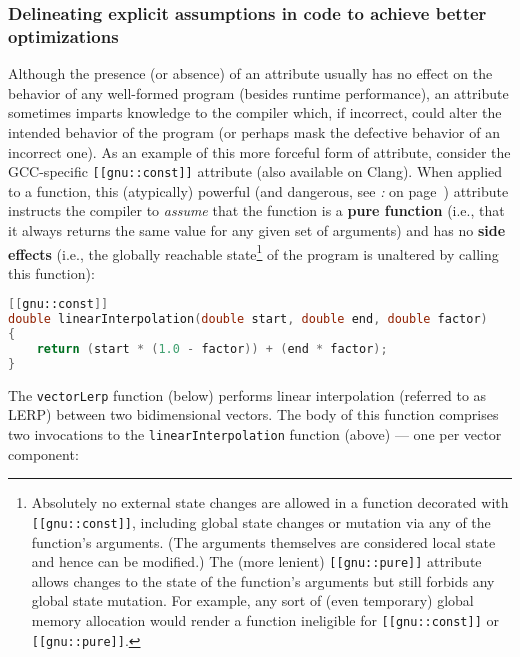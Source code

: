 \subsubsection[Delineating explicit assumptions in code to achieve better optimizations]{Delineating explicit assumptions in code to achieve better optimizations}\label{delineating-explicit-assumptions-in-code-to-achieve-better-optimizations}

Although the presence (or absence) of an attribute usually has no effect
on the behavior of any well-formed program (besides runtime performance),
an attribute sometimes imparts knowledge to the compiler
which, if incorrect, could alter the intended behavior of the program
(or perhaps mask the defective behavior of an incorrect one). As an
example of this more forceful form of attribute, consider the
GCC-specific \texttt{[[gnu::const]]} attribute (also available on
Clang). When applied to a function, this (atypically) powerful (and
dangerous, see {\it{}:} {\it{}} on page~\pageref{some-attributes,-if-misused,-can-affect-program-correctness}) attribute instructs the compiler to \emph{assume}
that the function is a \textbf{pure function} (i.e., that it always
returns the same value for any given set of arguments) and has no
\textbf{side effects} (i.e., the globally reachable
state{\cprotect\footnote{Absolutely no external state changes are
allowed in a function decorated with \texttt{[[gnu::const]]},
including global state changes or mutation via any of the function's
arguments. (The arguments themselves are considered local state and
hence can be modified.) The (more lenient) \texttt{[[gnu::pure]]}
attribute allows changes to the state of the function's arguments but still
forbids any global state mutation. For example, any sort of (even
temporary) global memory allocation would render a function ineligible
  for \texttt{[[gnu::const]]} or \texttt{[[gnu::pure]]}.}} of the
program is unaltered by calling this function):

\begin{lstlisting}[language=C++]
[[gnu::const]]
double linearInterpolation(double start, double end, double factor)
{
    return (start * (1.0 - factor)) + (end * factor);
}
\end{lstlisting}
    
\noindent The \texttt{vectorLerp} function (below) performs linear
interpolation (referred to as LERP) between two bidimen\-sional vectors. The body
of this function comprises two invocations to the
\mbox{\texttt{linearInterpolation}} function (above) --- one per vector
component:

